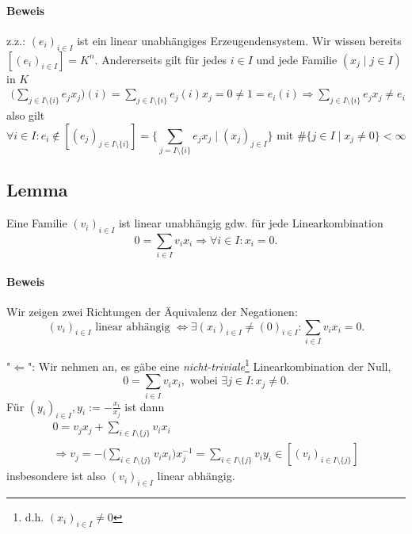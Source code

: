 \paragraph{Beweis}
	z.z.: $ (e_i)_{i\in I} $ ist ein linear unabhängiges Erzeugendensystem. Wir wissen bereits $ [(e_i)_{i\in I}] = K^n $. Andererseits gilt für jedes $i\in I$ und jede Familie $(x_j\mid j\in I)$ in $ K $
	\begin{gather*}
		\Big(\sum_{j\in I\setminus\{i\}}e_jx_j\Big)(i) = \sum_{j\in I\setminus\{i\}}e_j(i)x_j = 0 \neq 1 = e_i(i) \Rightarrow \sum_{j\in I\setminus\{i\}} e_jx_j \neq e_i
	\end{gather*}
	also gilt
	\begin{equation*}
		\forall i\in I: e_i \notin [(e_j)_{j\in I\setminus\{i\}}] = \Big\{\sum_{j=I\setminus\{i\}} e_jx_j\mid (x_j)_{ j\in I}\Big\} \text{ mit } \#\{j\in I\mid x_j \neq 0\}<\infty
	\end{equation*}
	
\subsection{Lemma}
	\begin{Lemma}
		Eine Familie $(v_i)_{i\in I}$ ist linear unabhängig gdw. für jede Linearkombination
		\[0 = \sum_{i\in I} v_ix_i \Rightarrow \forall i\in I: x_i = 0.\]
	\end{Lemma}

\paragraph{Beweis}
	Wir zeigen zwei Richtungen der Äquivalenz der Negationen: 
		\[(v_i)_{i\in I} \text{ linear abhängig } \Leftrightarrow \exists(x_i)_{i\in I} \neq (0)_{i\in I}: \sum_{i\in I} v_ix_i = 0.\]
        
	"$\Leftarrow$":
	Wir nehmen an, es gäbe eine \emph{nicht-triviale}\footnote{d.h. $(x_i)_{i\in I}\neq 0$} Linearkombination der Null,
		\[0 = \sum_{i\in I} v_ix_i, \text{ wobei } \exists j\in I: x_j \neq 0.\]
	Für $(y_i)_{i\in I}, y_i := - \frac{x_i}{x_j}$ ist dann
	\begin{gather*}
		0 = v_jx_j + \sum_{i\in I\setminus\{j\}} v_ix_i \\
		\Rightarrow v_j = -\Big(\sum_{i\in I\setminus\{j\}}v_ix_i\Big)x_j^{-1} = \sum_{i\in I\setminus\{j\}} v_iy_i \in [(v_i)_{i\in I\setminus\{j\}}]
	\end{gather*}
	insbesondere ist also $(v_i)_{i\in I}$ linear abhängig.
	
